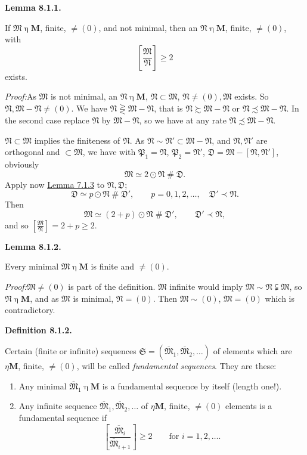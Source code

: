 \documentclass[12pt,b5paper,twoside]{article}
\newcommand{\M}{\mathbf M}
\newcommand{\reldiv}[2]{\left[\frac{#1}{#2}\right]}
\newcommand{\Definition}[1]{%
  \par\smallskip\noindent\phantomsection\label{def:#1}\textbf{Definition #1.}\enspace
}
\newcommand{\Lemma}[1]{%
  \par\smallskip\noindent\phantomsection\label{lem:#1}\textbf{Lemma #1.}\enspace
}
\newcommand{\Proof}{\par\noindent\textit{Proof:}\enspace}
\newcommand{\lemref}[1]{\hyperref[lem:#1]{Lemma #1}}
\begin{document}
\Lemma{8.1.1}
If $\mathfrak M\mathbin\eta\M$, finite, $\ne(0)$, and not minimal, then an
$\mathfrak N\mathbin\eta\M$, finite, $\ne(0)$, with
\[
 \reldiv{\mathfrak M}{\mathfrak N}\geq2
\]
exists.

\Proof As $\mathfrak M$ is not minimal, an $\mathfrak N\mathbin\eta\M$,
$\mathfrak N\subset\mathfrak M$, $\mathfrak N\ne(0),\mathfrak M$ exists. So
$\mathfrak N,\mathfrak M-\mathfrak N\ne(0)$. We have
$\mathfrak N\gtreqless\mathfrak M-\mathfrak N$, that is
$\mathfrak N\succsim\mathfrak M-\mathfrak N$ or
$\mathfrak N\precsim\mathfrak M-\mathfrak N$. In the second case replace
$\mathfrak N$ by $\mathfrak M-\mathfrak N$, so we have at any rate
$\mathfrak N\precsim\mathfrak M-\mathfrak N$.

$\mathfrak N\subset\mathfrak M$ implies the finiteness of $\mathfrak N$. As
$\mathfrak N\sim\mathfrak N'\subset\mathfrak M-\mathfrak N$, and
$\mathfrak N,\mathfrak N'$ are orthogonal and $\subset\mathfrak M$, we have
with $\mathfrak P_1=\mathfrak N$, $\mathfrak P_2=\mathfrak N'$,
$\mathfrak D=\mathfrak M-[\mathfrak N,\mathfrak N']$, obviously
\[
 \mathfrak M\simeq2\odot\mathfrak N\mathbin{\#}\mathfrak D.
\]
Apply now \lemref{7.1.3} to $\mathfrak N,\mathfrak D$;
\[
 \mathfrak D\simeq p\odot\mathfrak N\mathbin{\#}\mathfrak D',
 \qquad p=0,1,2,\ldots,\quad \mathfrak D'\prec\mathfrak N.
\]
Then
\[
 \mathfrak M\simeq(2+p)\odot\mathfrak N\mathbin{\#}\mathfrak D',
 \qquad \mathfrak D'\prec\mathfrak N,
\]
and so $\reldiv{\mathfrak M}{\mathfrak N}=2+p\geq2$.

\Lemma{8.1.2}
Every minimal $\mathfrak M\mathbin\eta\M$ is finite and $\ne(0)$.

\Proof $\mathfrak M\ne(0)$ is part of the definition. $\mathfrak M$ infinite
would imply $\mathfrak M\sim\mathfrak N\subsetneqq\mathfrak M$,
so $\mathfrak N\mathbin\eta\M$, and as $\mathfrak M$ is minimal,
$\mathfrak N=(0)$. Then $\mathfrak M\sim(0)$, $\mathfrak M=(0)$ which is
contradictory.

\Definition{8.1.2}
Certain (finite or infinite) sequences
$\mathfrak S=(\overline{\mathfrak M}_1,\overline{\mathfrak M}_2,\ldots)$ of
elements which are $\mathbin\eta\M$, finite, $\ne(0)$, will be called
\emph{fundamental sequences}. They are these:
\begin{enumerate}[leftmargin=2.4em]
\item[$(\alpha)$] Any minimal $\overline{\mathfrak M}_1\mathbin\eta\M$ is a fundamental
  sequence by itself (length one!).
\item[$(\beta)$] Any infinite sequence
  $\overline{\mathfrak M}_1,\overline{\mathfrak M}_2,\ldots$ of
  $\mathbin\eta\M$, finite, $\ne(0)$ elements is a fundamental sequence if
  \[
   \reldiv{\overline{\mathfrak M}_i}{\overline{\mathfrak M}_{i+1}}\geq2
   \qquad\text{for }i=1,2,\ldots.
  \]
\end{enumerate}
\end{document}

